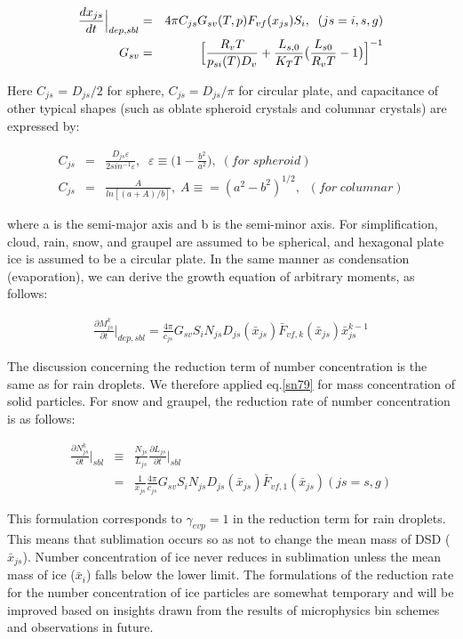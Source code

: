 \begin{eqnarray}
\frac{dx_{js}}{dt}\Bigr|_{dep,sbl}&=&4\pi C_{js}G_{sv}(T,p)F_{vf}(x_{js})S_{i},\;\;(js=i,s,g)\label{sn75}\\
G_{sv}&=&\Bigl[\frac{R_{v}T}{p_{si}(T)D_{v}}+\frac{L_{s,0}}{K_{T}T}\bigl(\frac{L_{s0}}{R_{v}T}-1\bigr)\Bigr]^{-1}\label{sn76}
\end{eqnarray}

Here $C_{js}$ = $D_{js}/2$ for sphere, $C_{js} = D_{js}/\pi$ for circular plate, and capacitance of other typical shapes (such as oblate spheroid crystals and columnar crystals) are expressed by:

\begin{eqnarray}
C_{js}&=&\frac{D_{js}\varepsilon}{2sin^{-1}\varepsilon},\;\;\varepsilon\equiv\bigl(1-\frac{b^{2}}{a^{2}}\bigr), \;(for\;spheroid)\label{sn77}\\
C_{js}&=&\frac{A}{ln[(a+A)/b]},\;A\equiv=(a^{2}-b^{2})^{1/2},\;\;(for\;columnar)
\end{eqnarray}

where a is the semi-major axis and b is the semi-minor axis. For simplification, cloud, rain, snow, and graupel are assumed to be spherical, and hexagonal plate ice is assumed to be a circular plate. In the same manner as condensation (evaporation), we can derive the growth equation of arbitrary moments, as follows:

\begin{eqnarray}
\frac{\partial M_{js}^{k}}{\partial t}\Bigr|_{dep,sbl}=\frac{4\pi}{c_{js}}G_{sv}S_{i}N_{js}D_{js}(\bar{x}_{js})\bar{F}_{vf,k}(\bar{x}_{js})\bar{x}_{js}^{k-1}\label{sn79}
\end{eqnarray}

The discussion concerning the reduction term of number concentration is the same as for rain droplets. We therefore applied eq.\ref{sn79} for mass concentration of solid particles. For snow and graupel, the reduction rate of number concentration is as follows:

\begin{eqnarray}
\frac{\partial N_{js}^{k}}{\partial t}\Bigr|_{sbl}&\equiv&\frac{N_{js}}{L_{js}}\frac{\partial L_{js}}{\partial t}\Bigr|_{sbl}\nonumber\\
&=&\frac{1}{\bar{x}_{js}}\frac{4\pi}{c_{js}}G_{sv}S_{i}N_{js}D_{js}(\bar{x}_{js})\bar{F}_{vf,1}(\bar{x}_{js})(js=s,g)\label{sn80}
\end{eqnarray}

This formulation corresponds to $\gamma_{evp} = 1$ in the reduction term for rain droplets. This means that sublimation occurs so as not to change the mean mass of DSD ($\bar{x}_{js}$). Number concentration of ice never reduces in sublimation unless the mean mass of ice ($\bar{x}_{i}$) falls below the lower limit. The formulations of the reduction rate for the number concentration of ice particles are somewhat temporary and will be improved based on insights drawn from the results of microphysics bin schemes and observations in future.

